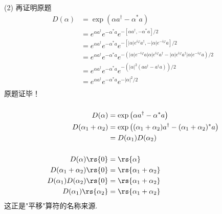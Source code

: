     \begin{frame} 
    \frametitle{}
         
    (2) 再证明原题
    \[ 
  \begin{aligned}
      D(\alpha) &=\exp \left(\alpha a^{\dagger}-\alpha^{*} a\right) \\  
      &= e^{\alpha a^{\dagger}} e^{-\alpha^{*} a} e^{-[\alpha a^{\dagger},-\alpha^{*} a]/2}  \\
      &= e^{\alpha a^{\dagger}} e^{-\alpha^{*} a} e^{-[\left|\alpha\right| e^{i\varphi} a^{\dagger},-\left|\alpha\right| e^{-i\varphi} a]/2}  \\
      &= e^{\alpha a^{\dagger}} e^{-\alpha^{*} a} e^{-(\left|\alpha\right| e^{-i\varphi} a\left|\alpha\right| e^{i\varphi} a^{\dagger}- \left|\alpha\right| e^{i\varphi} a^{\dagger}\left|\alpha\right| e^{-i\varphi} a)/2}  \\
      &= e^{\alpha a^{\dagger}} e^{-\alpha^{*} a} e^{-(\left|\alpha\right|^2  (a a^{\dagger}-  a^{\dagger} a))/2}  \\
      &= e^{\alpha a^{\dagger}} e^{-\alpha^{*} a} e^{-\left|\alpha\right|^2 /2} \\
  \end{aligned}  
    \]
    原题证毕！
 \end{frame}

 \begin{frame}
    \frametitle{}
    \证 
  \[ 
    \begin{aligned}
        D(\alpha) &=\exp \left(\alpha a^{\dagger}-\alpha^{*} a\right) \\
        D (\alpha_1+ \alpha_2) &= \exp \left((\alpha_1+ \alpha_2) a^{\dagger}-(\alpha_1+\alpha_2)^{*} a\right) \\
        &= D (\alpha_1) D(\alpha_2) \\
        & ~ \\
        D (\alpha) \rs{0} &= \rs{\alpha} \\
        D (\alpha_1+ \alpha_2) \rs{0} &= \rs{\alpha_1+ \alpha_2} \\
        D (\alpha_1) D(\alpha_2)\rs{0} &= \rs{\alpha_1+ \alpha_2} \\
        D (\alpha_1) \rs{\alpha_2} &= \rs{\alpha_1+ \alpha_2} \\
  \end{aligned}  
  \] 
  这正是"平移"算符的名称来源.
\end{frame}
 
